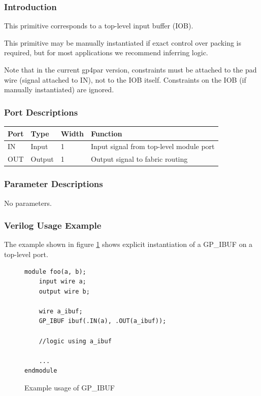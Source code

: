 \documentclass{article}
\begin{document}
\subsubsection{Introduction}
This primitive corresponds to a top-level input buffer (IOB).

This primitive may be manually instantiated if exact control over packing is required, but for most applications we 
recommend inferring logic.

Note that in the current gp4par version, constraints must be attached to the pad wire (signal attached to IN), not 
to the IOB itself. Constraints on the IOB (if manually instantiated) are ignored.

\subsubsection{Port Descriptions}

\begin{tabularx}{4in}{|l|l|l|X|}
\hline
{\bfseries Port} & {\bfseries Type} & {\bfseries Width} & {\bfseries Function} \\
\hline
IN & Input & 1 & Input signal from top-level module port \\
\hline
OUT & Output & 1 & Output signal to fabric routing \\
\hline
\end{tabularx}

\subsubsection{Parameter Descriptions}

No parameters.

\subsubsection{Verilog Usage Example}

The example shown in figure \ref{gp-ibuf-example} shows explicit instantiation of a GP\_IBUF on a top-level port.

\begin{figure}[h]
\begin{lstlisting}
module foo(a, b);
	input wire a;
	output wire b;
	
	wire a_ibuf;
	GP_IBUF ibuf(.IN(a), .OUT(a_ibuf));
	
	//logic using a_ibuf
	
	...
endmodule
\end{lstlisting}
\caption{Example usage of GP\_IBUF}
\label{gp-ibuf-example}
\end{figure}
\end{document}
